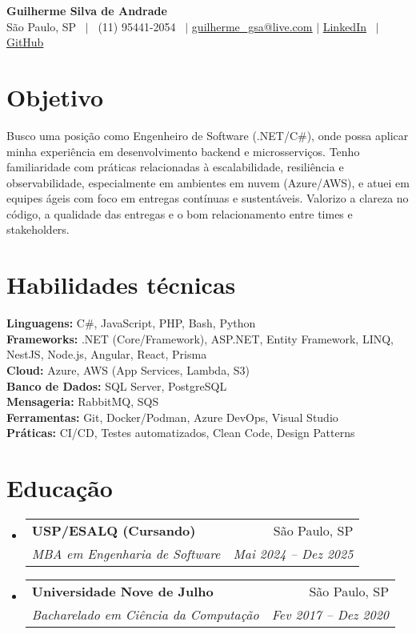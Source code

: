 \documentclass[letterpaper,11pt]{article}
\makeatletter
\newcommand{\resumeSubheading}[4]{
  \vspace{-2pt}\item
    \begin{tabular*}{0.97\textwidth}[t]{l@{\extracolsep{\fill}}r}
      \textbf{#1} & #2 \\
      \textit{\small#3} & \textit{\small #4} \\
    \end{tabular*}\vspace{-7pt}
}
\newcommand{\resumeSubHeadingListStart}{\begin{itemize}[leftmargin=0.15in, label={}]}
\newcommand{\resumeSubHeadingListEnd}{\end{itemize}}
\makeatother
\begin{document}
\begin{center}
    \textbf{\Huge \bfseries Guilherme Silva de Andrade} \\ \vspace{1pt}
    \small São Paulo, SP \ $|$ \ (11) 95441-2054 \ $|$ 
    \href{mailto:guilherme\_gsa@live.com}{\underline{guilherme\_gsa@live.com}} $|$ 
    \href{https://www.linkedin.com/in/xgandrade}{LinkedIn} \ $|$ 
    \href{https://github.com/xgandrade}{GitHub}
\end{center}

\section{Objetivo}
\justifying
Busco uma posição como Engenheiro de Software (.NET/C\#), onde possa aplicar minha experiência em desenvolvimento backend e microsserviços. Tenho familiaridade com práticas relacionadas à escalabilidade, resiliência e observabilidade, especialmente em ambientes em nuvem (Azure/AWS), e atuei em equipes ágeis com foco em entregas contínuas e sustentáveis. Valorizo a clareza no código, a qualidade das entregas e o bom relacionamento entre times e stakeholders.

\section{Habilidades técnicas}
 \begin{itemize}[leftmargin=0.15in, label={}]
    \small{\item{
        \textbf{Linguagens:} C\#, JavaScript, PHP, Bash, Python \\
        \textbf{Frameworks:} .NET (Core/Framework), ASP.NET, Entity Framework, LINQ, NestJS, Node.js, Angular, React, Prisma \\
        \textbf{Cloud:} Azure, AWS (App Services, Lambda, S3) \\
        \textbf{Banco de Dados:} SQL Server, PostgreSQL \\
        \textbf{Mensageria:} RabbitMQ, SQS \\
        \textbf{Ferramentas:} Git, Docker/Podman, Azure DevOps, Visual Studio \\
        \textbf{Práticas:} CI/CD, Testes automatizados, Clean Code, Design Patterns
    }}
 \end{itemize}

\section{Educação}
  \resumeSubHeadingListStart
    \resumeSubheading
      {USP/ESALQ (Cursando)}{São Paulo, SP}
      {MBA em Engenharia de Software}{Mai 2024 -- Dez 2025}
    \resumeSubheading
      {Universidade Nove de Julho}{São Paulo, SP}
      {Bacharelado em Ciência da Computação}{Fev 2017 -- Dez 2020}
  \resumeSubHeadingListEnd
\end{document}
